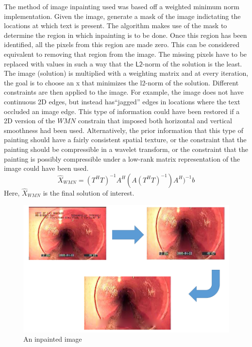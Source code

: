 \documentclass[letterpaper,12pt, onecolumn]{article}%
\begin{document}
The method of image inpainting used was based off a weighted minimum norm implementation. Given the image, generate a mask of the image indictating the locations at which text is present. The algorithm makes use of the mask to determine the region in which inpainting is to be done. Once this region has been identified, all the pixels from this region are made zero. This can be considered equivalent to removing that region from the image. The missing pixels have to be replaced with values in such a way that the $\mathsf{L2}$-norm of the solution is the least. The image (solution) is multiplied with a weighting matrix and at every iteration, the goal is to choose an x that minimizes the l2-norm of the solution. Different constraints are then applied to the image. For example, the image does not have continuous 2D edges, but instead has\enquote{jagged} edges in locations where the text occluded an image edge. This type of information could have been restored if a 2D version of the $WMN$ constrain that imposed both horizontal and vertical smoothness had been used. Alternatively, the prior information that this type of painting should have a fairly consistent spatial texture, or the constraint that the painting should be compressible in a wavelet transform, or the constraint that the painting is possibly compressible under a low-rank matrix representation of the image could have been used. 
\begin{equation}
\hat{X}_{WMN} = (T^H T)^{-1} A^H (A(T^H T)^{-1})A^H)^{-1}b
\end{equation}
Here, $\hat{X}_{WMN}$ is the final solution of interest. 
\begin{figure}[!hbtp]
 	  \centering
 	   \includegraphics[scale=0.5] {fig_inpaint.png} 
 	   \caption{An inpainted image}
       \label{fig:inpaint}
\end{figure}
\end{document}
